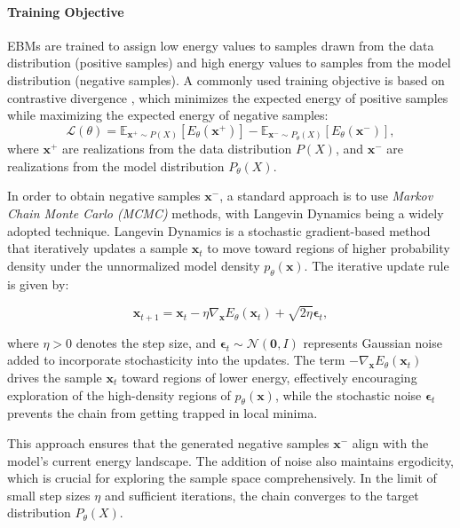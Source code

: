 \paragraph{Training Objective}

EBMs are trained to assign low energy values to samples drawn from the data distribution (positive samples) and high energy values to samples from the model distribution (negative samples). A commonly used training objective is based on contrastive divergence \cite{hinton2002training}, which minimizes the expected energy of positive samples while maximizing the expected energy of negative samples:
\[
\mathcal{L}(\theta) = \mathbb{E}_{\mathbf{x}^+ \sim P(X)} [E_\theta(\mathbf{x}^+)] - \mathbb{E}_{\mathbf{x}^- \sim P_\theta(X)} [E_\theta(\mathbf{x}^-)],
\]
where \( \mathbf{x}^+ \) are realizations from the data distribution \( P(X) \), and \( \mathbf{x}^- \) are realizations from the model distribution \( P_\theta(X) \).

In order to obtain negative samples \(\mathbf{x}^-\), a standard approach is to use \textit{Markov Chain Monte Carlo (MCMC)} methods, with Langevin Dynamics \cite{langevin1908theorie, neal2011mcmc} being a widely adopted technique. Langevin Dynamics is a stochastic gradient-based method that iteratively updates a sample \( \mathbf{x}_t \) to move toward regions of higher probability density under the unnormalized model density \( p_\theta(\mathbf{x}) \). The iterative update rule is given by:

\[
\mathbf{x}_{t+1} = \mathbf{x}_t - \eta \nabla_{\mathbf{x}} E_\theta(\mathbf{x}_t) + \sqrt{2\eta} \mathbf{\epsilon}_t,
\]

\noindent where \( \eta > 0 \) denotes the step size, and \( \mathbf{\epsilon}_t \sim \mathcal{N}(\mathbf{0}, I) \) represents Gaussian noise added to incorporate stochasticity into the updates. The term \( -\nabla_{\mathbf{x}} E_\theta(\mathbf{x}_t) \) drives the sample \( \mathbf{x}_t \) toward regions of lower energy, effectively encouraging exploration of the high-density regions of \( p_\theta(\mathbf{x}) \), while the stochastic noise \( \mathbf{\epsilon}_t \) prevents the chain from getting trapped in local minima.

This approach ensures that the generated negative samples \( \mathbf{x}^- \) align with the model's current energy landscape. The addition of noise also maintains ergodicity, which is crucial for exploring the sample space comprehensively. In the limit of small step sizes \( \eta \) and sufficient iterations, the chain converges to the target distribution \( P_\theta(X) \).
